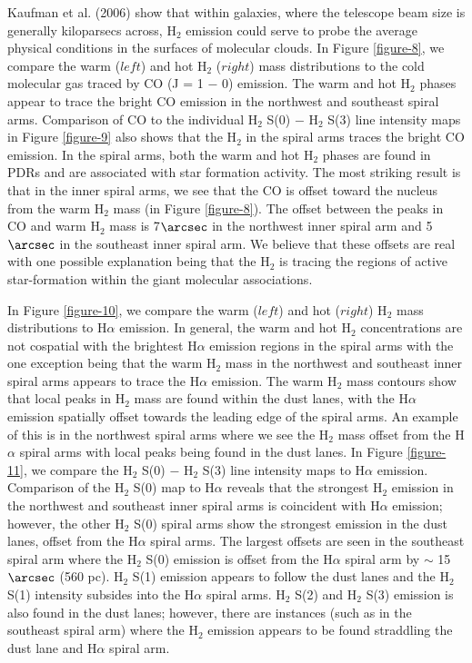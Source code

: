 \documentclass[12pt,preprint]{aastex}
\begin{document}
Kaufman et al. (2006) show that within galaxies, where the
telescope beam size is generally kiloparsecs across, H$_2$
emission could serve to probe the average physical 
conditions in the surfaces of molecular clouds.  In Figure 
\ref{figure-8}, we compare the warm ($left$) and hot
H$_2$ ($right$) mass distributions to the cold molecular 
gas traced by CO (J = 1 $-$ 0) emission.  The warm and hot 
H$_2$ phases appear to trace the bright CO emission
in the northwest and southeast spiral arms. Comparison 
of CO to the individual H$_2$  S(0) $-$ H$_2$ S(3) line intensity 
maps in Figure \ref{figure-9} also shows that the H$_2$ in 
the spiral arms traces the bright CO emission.  
In the spiral arms, both the warm and hot H$_2$ 
phases are found in PDRs and are associated 
with star formation activity.  The most 
striking result is that in the inner spiral arms, we see that the
CO is offset toward the nucleus from the 
warm H$_2$ mass (in Figure \ref{figure-8}).
The offset between the peaks in CO and warm H$_2$ mass is
7$\arcsec$ in the northwest inner spiral arm and 5$\arcsec$ in the
southeast inner spiral arm.  We believe that these offsets are real with
one possible explanation being that the H$_2$ is tracing the
regions of active star-formation within the giant molecular
associations.  

In Figure \ref{figure-10}, we compare the warm ($left$) and hot ($right$)
H$_2$ mass distributions to H$\alpha$ emission.  In general,
the warm and hot H$_2$ concentrations are not cospatial with
the brightest H$\alpha$ emission regions in the spiral arms with the one
exception being that the warm H$_2$ mass in 
the northwest and southeast inner spiral
arms appears to trace the H$\alpha$ emission.  The warm H$_2$
mass contours show that local peaks in H$_2$ mass are found
within the dust lanes, with the H$\alpha$ emission spatially 
offset towards the leading edge of the spiral arms.  
An example of this is in the northwest spiral
arms where we see the H$_2$ mass offset from the H$\alpha$
spiral arms with local peaks being found in the dust lanes.
In Figure \ref{figure-11}, we compare the H$_2$ S(0) $-$
H$_2$ S(3) line intensity maps to H$\alpha$ emission.
Comparison of the H$_2$ S(0) map to H$\alpha$ reveals that
the strongest H$_2$ emission in the northwest and southeast
inner spiral arms is coincident with H$\alpha$ emission; however, the
other H$_2$ S(0) spiral arms show the strongest emission in
the dust lanes, offset from the H$\alpha$ spiral arms.  The largest
offsets are seen in the southeast spiral arm where the H$_2$
S(0) emission is offset from the H$\alpha$ spiral arm by $\sim$
15$\arcsec$ (560 pc).  H$_2$ S(1) emission appears to follow
the dust lanes and the H$_2$ S(1) intensity subsides into the
H$\alpha$ spiral arms.  H$_2$ S(2) and H$_2$ S(3)
emission is also found in the dust lanes; however, there are instances
(such as in the southeast spiral arm) where the H$_2$
emission appears to be found straddling the dust lane and H$\alpha$
spiral arm.
\end{document}
